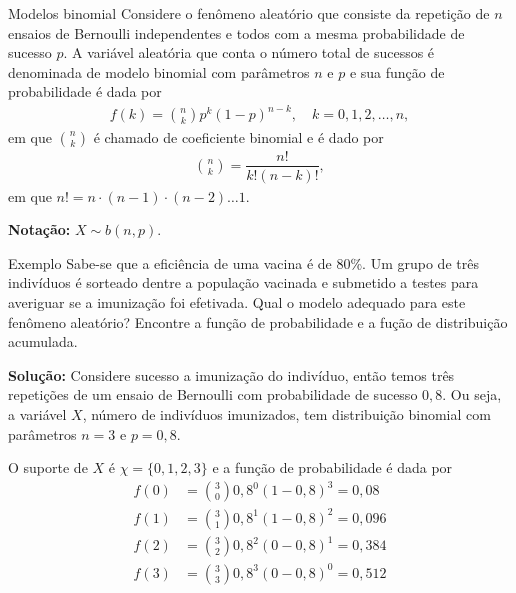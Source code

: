 \documentclass[9pt]{beamer}
\begin{document}
\begin{frame}{Modelos binomial}
Considere o fenômeno aleatório que consiste da repetição de $n$ ensaios de Bernoulli independentes e todos com a mesma probabilidade de sucesso $p$. A variável aleatória que conta o número total de sucessos é denominada de modelo binomial com parâmetros $n$ e $p$ e sua função de probabilidade é dada por
\begin{align*}
f(k) = \binom{n}{k} p^k (1-p)^{n-k}, \quad k=0,1,2, \dots, n,
\end{align*}
em que $\binom{n}{k}$ é chamado de coeficiente binomial e é dado por
\begin{align*}
\binom{n}{k} = \dfrac{n!}{k! (n-k)!},
\end{align*}
em que $n! = n \cdot (n-1) \cdot (n-2) \dots   1$.

\textbf{Notação:} $X \sim b(n, p)$.
\end{frame}

\begin{frame}{Exemplo}
Sabe-se que a eficiência de uma vacina é de 80\%. Um grupo de três indivíduos é sorteado dentre a população vacinada e submetido a testes para averiguar se a imunização foi efetivada. 
Qual o modelo adequado para este fenômeno aleatório? Encontre a função de probabilidade e a fução de distribuição acumulada.
\vfill

\textbf{Solução:} Considere sucesso a imunização do indivíduo, então temos três repetições de um ensaio de Bernoulli com probabilidade de sucesso $0,8$. Ou seja, a variável $X$, número de indivíduos imunizados, tem distribuição binomial com parâmetros $n=3$ e $p=0,8$. 

O suporte de $X$ é $\chi=\{0,1,2,3\}$ e a função de probabilidade é dada por
\begin{align*}
 f(0) &= \binom{3}{0} 0,8^0 (1-0,8)^3 = 0,08\\
 f(1) &= \binom{3}{1} 0,8^1 (1-0,8)^2 = 0,096\\
 f(2) &= \binom{3}{2} 0,8^2 (0-0,8)^1 = 0,384\\
 f(3) &= \binom{3}{3} 0,8^3 (0-0,8)^0 = 0,512\\
\end{align*}
\end{frame}

\end{document}
